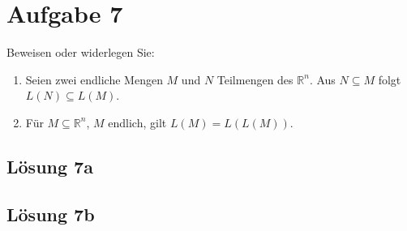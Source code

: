\documentclass[main.tex]{subfiles}
\begin{document}
\section{Aufgabe 7}

Beweisen oder widerlegen Sie:
\begin{enumerate}
    \item Seien zwei endliche Mengen $M$ und $N$ Teilmengen des $\mathbb{R}^{n}$. Aus $N\subseteq M$ folgt $L( N) \subseteq L( M)$.
    \item Für $M\subseteq \mathbb{R}^{n}$, $M$ endlich, gilt $L( M) =L( L( M))$.
\end{enumerate}

\subsection{Lösung 7a}
\subsection{Lösung 7b}
\end{document}
